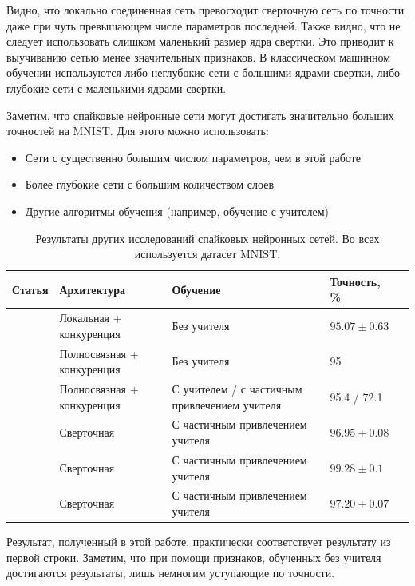 \documentclass[a4paper]{article}
\begin{document}

Видно, что локально соединенная сеть превосходит сверточную сеть по точности даже при чуть превышающем числе параметров последней. Также видно, что не следует использовать слишком маленький размер ядра свертки. Это приводит к выучиванию сетью менее значительных признаков. В классическом машинном обучении используются либо неглубокие сети с большими ядрами свертки, либо глубокие сети с маленькими ядрами свертки.

Заметим, что спайковые нейронные сети могут достигать значительно больших точностей на MNIST. Для этого можно использовать:
\begin{itemize}
\item Сети с существенно большим числом параметров, чем в этой работе
\item Более глубокие сети с большим количеством слоев
\item Другие алгоритмы обучения (например, обучение с учителем)
\end{itemize}

\begin{table}[H]
 \caption{Результаты других исследований спайковых нейронных сетей. Во всех используется датасет MNIST.}
\begin{center}
\begin{tabular}{|l|p{4cm}|p{7cm}|l|l|}
\hline
Статья & Архитектура & Обучение & Точность, \% \\
\hline
{\cite{saunders2019locally}} & {Локальная + конкуренция} & {Без учителя} & {$95.07 \pm 0.63$}\\
\hline
{\cite{mnist1}} & {Полносвязная + конкуренция} & {Без учителя} & {95}\\
\hline
{\cite{MaxActiv1}} & {Полносвязная + конкуренция} & {С учителем / с частичным привлечением учителя} & {95.4 / 72.1}\\
\hline
{\cite{conv1}} & {Сверточная} & {С частичным привлечением учителя} & {$96.95 \pm 0.08$}\\
\hline
{\cite{conv2}} & {Сверточная} & {С частичным привлечением учителя} & {$99.28 \pm 0.1$}\\
\hline
{\cite{conv3}} & {Сверточная} & {С частичным привлечением учителя} & {$97.20 \pm 0.07$}\\
\hline
\end{tabular}
\end{center}
\end{table}

Результат, полученный в этой работе, практически соответствует результату из первой строки. Заметим, что при помощи признаков, обученных без учителя достигаются результаты, лишь немногим уступающие по точности.
\end{document}
